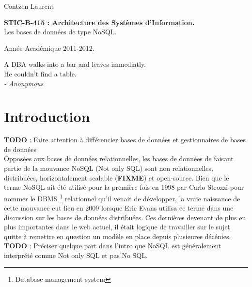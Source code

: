 \documentclass[11pt]{article}
\author{Contzen Laurent}
\begin{document}
\begin{titlepage}  
  \begin{flushleft}
    Contzen Laurent
  \end{flushleft}
  \begin{center}
    \vspace{85mm}\LARGE{\textbf{STIC-B-415 : Architecture des Systèmes d'Information.} \\    
      Les bases de données de type NoSQL.}
  \end{center}
  \begin{flushright}
    \vspace{95mm}
    Année Académique 2011-2012.             
  \end{flushright}
\end{titlepage}

\tableofcontents
\newpage
\vspace*{\fill}
\begin{flushright}
  A DBA walks into a bar and leaves immediatly. \\
  He couldn't find a table. \\
  \textit{- Anonymous}
\end{flushright}
\vspace*{\fill}
\newpage

\section{Introduction}
\textbf{\textbf{TODO}} : Faire attention à différencier bases de données et gestionnaires de bases de données \\
Opposées aux bases de données relationnelles, les bases de données de faisant partie de la mouvance NoSQL (Not only SQL) sont non relationnelles, distribuées, horizontalement scalable (\textbf{FIXME}) et open-source. Bien que le terme NoSQL ait été utilisé pour la première fois en 1998 par Carlo Strozzi pour nommer le DBMS \footnote{Database management system} relationnel qu'il venait de développer, la vraie naissance de cette mouvance eut lieu en 2009 lorsque Eric Evans utilisa ce terme dans une discussion sur les bases de données distribuées. Ces dernières devenant de plus en plus importantes dans le web actuel, il était logique de travailler sur le sujet quitte à remettre en question un modèle en place depuis plusieures décénies. \textbf{TODO} : Préciser quelque part dans l'intro que NoSQL est généralement interprété comme Not only SQL et pas No SQL.
\end{document}
